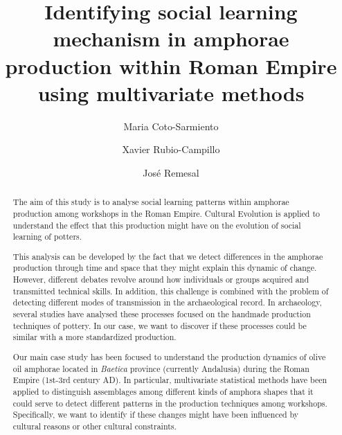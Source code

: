 \documentclass[review]{elsarticle}
\begin{document}
\begin{frontmatter}

\title{Identifying social learning mechanism in amphorae production within Roman Empire using multivariate methods }


\author[bscadress]{Maria Coto-Sarmiento}


\author[edadress]{Xavier Rubio-Campillo}
\author[ceipacadress]{Jos\'e Remesal}




\address[bscadress]{Barcelona Supercomputing Center (BSC), Barcelona, Spain}
\address[edadress]{University of Edinburgh, UK}
\address[ceipacadress]{CEIPAC, University of Barcelona, Barcelona, Spain}
\begin{abstract}

The aim of this study is to analyse social learning patterns within amphorae production among workshops in the Roman Empire. Cultural Evolution is applied to understand the effect that this production might have on the evolution of social learning of potters. 

This analysis can be developed by the fact that we detect differences in the amphorae production through time and space that they might explain this dynamic of change. However,  different debates revolve around how individuals or groups acquired and transmitted technical skills. In addition, this challenge is combined with the problem of detecting different modes of transmission in the archaeological record. In archaeology, several studies have analysed these processes focused on the handmade production techniques of pottery. In our case, we want to discover if these processes could be similar with a more standardized production. 

Our main case study has been focused to understand the production dynamics of olive oil amphorae located in \textit{Baetica} province (currently Andalusia) during the Roman Empire (1st-3rd century AD). In particular, multivariate statistical methods have been applied to distinguish  assemblages among different kinds of amphora shapes that it could serve to detect different patterns in the production techniques among workshops. Specifically, we want to identify if these changes might have been influenced by cultural reasons or other cultural constraints.


\end{abstract}
\end{frontmatter}
\end{document}
